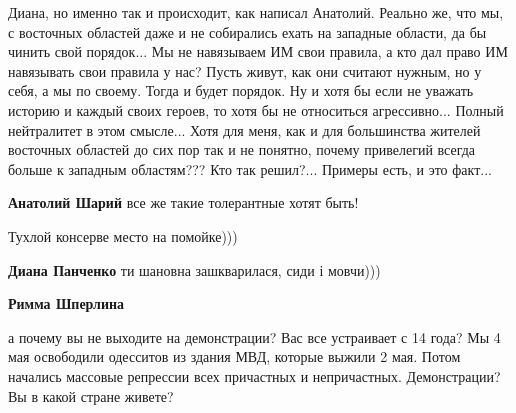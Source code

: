 \begin{itemize}
\begin{itemize}
 

Диана, но именно так и происходит, как написал Анатолий. Реально же, что мы, с
восточных областей даже и не собирались ехать на западные области, да бы чинить
свой порядок... Мы не навязываем ИМ свои правила, а кто дал право ИМ навязывать
свои правила у нас? Пусть живут, как они считают нужным, но у себя, а мы по
своему. Тогда и будет порядок. Ну и хотя бы если не уважать историю и каждый
своих героев, то хотя бы не относиться агрессивно... Полный нейтралитет в этом
смысле... Хотя для меня, как и для большинства жителей восточных областей до сих
пор так и не понятно, почему привелегий всегда больше к западным областям??? Кто
так решил?... Примеры есть, и это факт...

 
\textbf{Анатолий Шарий} все же такие толерантные хотят быть! 🤝

 
Тухлой консерве место на помойке)))

 
\textbf{Диана Панченко} ти шановна зашкварилася, сиди і мовчи)))

 
\textbf{Римма Шперлина} 

а почему вы не выходите на демонстрации? Вас все устраивает с 14 года? Мы 4 мая
освободили одесситов из здания МВД, которые выжили 2 мая. Потом начались
массовые репрессии всех причастных и непричастных. Демонстрации? Вы в какой
стране живете?


\end{itemize}
\end{itemize}
